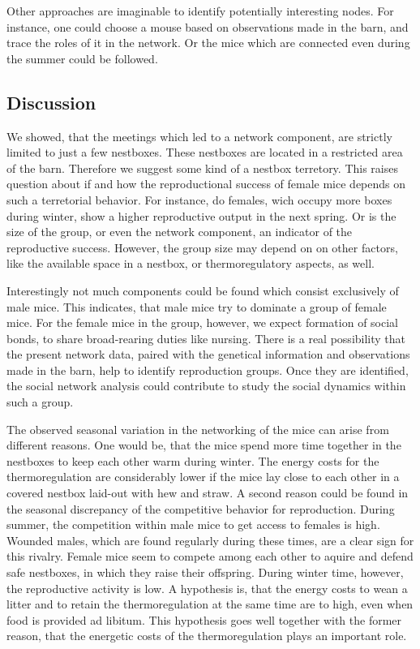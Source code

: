 Other approaches are imaginable to identify potentially interesting nodes. For instance, one could choose a mouse based on observations made in the barn, and trace the roles of it in the network. Or the mice which are connected even during the summer could be followed.

\subsection{Discussion}
\label{subsec:discussion}

We showed, that the meetings which led to a network component, are strictly limited to just a few nestboxes. These nestboxes are located in a restricted area of the barn. Therefore we suggest some kind of a nestbox terretory. This raises question about if and how the reproductional success of female mice depends on such a terretorial behavior. For instance, do females, wich occupy more boxes during winter, show a higher reproductive output in the next spring. Or is the size of the group, or even the network component, an indicator of the reproductive success. However, the group size may depend on on other factors, like the available space in a nestbox, or thermoregulatory aspects, as well.

Interestingly not much components could be found which consist exclusively of male mice. This indicates, that male mice try to dominate a group of female mice. For the female mice in the group, however, we expect formation of social bonds, to share broad-rearing duties like nursing. There is a real possibility that the present network data, paired with the genetical information and observations made in the barn, help to identify reproduction groups. Once they are identified, the social network analysis could contribute to study the social dynamics within such a group.     

The observed seasonal variation in the networking of the mice can arise from different reasons. One would be, that the mice spend more time together in the nestboxes to keep each other warm during winter. The energy costs for the thermoregulation are considerably lower if the mice lay close to each other in a covered nestbox laid-out with hew and straw. A second reason could be found in the seasonal discrepancy of the competitive behavior for reproduction. During summer, the competition within male mice to get access to females is high. Wounded males, which are found regularly during these times, are a clear sign for this rivalry. Female mice seem to compete among each other to aquire and defend safe nestboxes, in which they raise their offspring. During winter time, however, the reproductive activity is low. A hypothesis is, that the energy costs to wean a litter and to retain the thermoregulation at the same time are to high, even when food is provided ad libitum. This hypothesis goes well together with the former reason, that the energetic costs of the thermoregulation plays an important role.    

